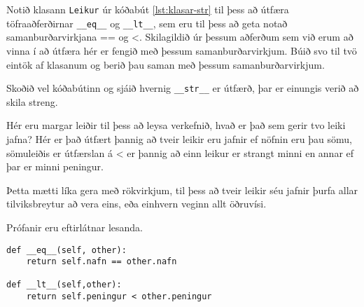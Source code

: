 \begin{exercise}\label{kla2}
Notið klasann \texttt{Leikur} úr kóðabút \ref{lst:klasar-str} til þess að útfæra töfraaðferðirnar \texttt{\_\_eq\_\_} og \texttt{\_\_lt\_\_}, sem eru til þess að geta notað samanburðarvirkjana == og <.
Skilagildið úr þessum aðferðum sem við erum að vinna í að útfæra hér er fengið með þessum samanburðarvirkjum.
Búið svo til tvö eintök af klasanum og berið þau saman með þessum samanburðarvirkjum.

Skoðið vel kóðabútinn og sjáið hvernig \texttt{\_\_str\_\_} er útfærð, þar er einungis verið að skila streng.
\end{exercise}
\begin{Answer}[ref={kla2}]
	Hér eru margar leiðir til þess að leysa verkefnið, hvað er það sem gerir tvo leiki jafna?
	Hér er það útfært þannig að tveir leikir eru jafnir ef nöfnin eru þau sömu, sömuleiðis er útfærslan á < er þannig að einn leikur er strangt minni en annar ef þar er minni peningur.
	
	Þetta mætti líka gera með rökvirkjum, til þess að tveir leikir séu jafnir þurfa allar tilviksbreytur að vera eins, eða einhvern veginn allt öðruvísi.
	
	Prófanir eru eftirlátnar lesanda.
	\begin{lstlisting}
def __eq__(self, other):
	return self.nafn == other.nafn

def __lt__(self,other):
	return self.peningur < other.peningur\end{lstlisting}
\end{Answer}